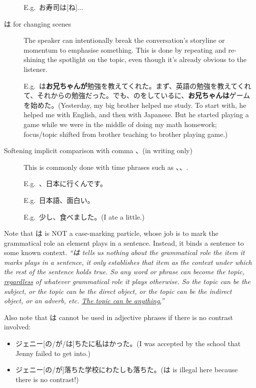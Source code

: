 \documentclass[../nihongo-gakushuu-kyouzai.tex]{subfiles}
\begin{document}
\begin{description}
    E.g.\ お寿司は[ね]...
    \item[は for changing scenes] The speaker can intentionally break the conversation's storyline or momentum to emphasise something. This is done by repeating and re-shining the spotlight on the topic, even though it's already obvious to the listener.

    E.g.\ は\textbf{お兄ちゃんが}勉強を教えてくれた。まず、英語の勉強を教えてくれて、それからの勉強だった。でも、のをしているに、\textbf{お兄ちゃんは}ゲームを始めた。(Yesterday, my big brother helped me study. To start with, he helped me with English, and then with Japanese. But he started playing a game while we were in the middle of doing my math homework; focus/topic shifted from brother teaching to brother playing game.)

    \item[Softening implicit comparison with comma 、(in writing only)] This is commonly done with time phrases such as 、、.%

    E.g.\ 、日本に行くんです。

    E.g.\ 日本語、面白い。

    E.g.\ 少し、食べました。(I ate a little.)


\end{description}

Note that は is NOT a case-marking particle, whose job is to mark the grammatical role an element plays in a sentence. Instead, it binds a sentence to some known context. \emph{``は tells us nothing about the grammatical role the item it marks plays in a sentence, it only establishes that item as the context under which the rest of the sentence holds true. So any word or phrase can become the topic, \ul{regardless} of whatever grammatical role it plays otherwise. So the topic can be the subject, or the topic can be the direct object, or the topic can be the indirect object, or an adverb, etc. \ul{The topic can be anything.}''}

Also note that は cannot be used in adjective phrases if there is no contrast involved:
\begin{itemize}
    \item ジェニー[の/が/は]ちたに私はかった。(I was accepted by the school that Jenny failed to get into.)
    \item ジェニー[の/が]落ちた学校にわたしも落ちた。(は is illegal here because there is no contrast!)
\end{itemize}
\end{document}
